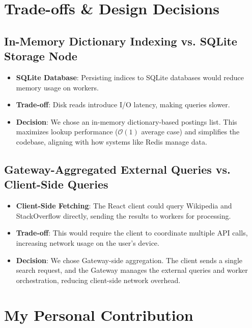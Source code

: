 \documentclass[11pt,a4paper]{article}
\begin{document}
\begin{itemize}
\newpage

\section{Trade-offs \& Design Decisions}

\subsection{In-Memory Dictionary Indexing vs. SQLite Storage Node}
\begin{itemize}
    \item \textbf{SQLite Database}: Persisting indices to SQLite databases would reduce memory usage on workers.
    \item \textbf{Trade-off}: Disk reads introduce I/O latency, making queries slower.
    \item \textbf{Decision}: We chose an in-memory dictionary-based postings list. This maximizes lookup performance ($\mathcal{O}(1)$ average case) and simplifies the codebase, aligning with how systems like Redis manage data.
\end{itemize}

\subsection{Gateway-Aggregated External Queries vs. Client-Side Queries}
\begin{itemize}
    \item \textbf{Client-Side Fetching}: The React client could query Wikipedia and StackOverflow directly, sending the results to workers for processing.
    \item \textbf{Trade-off}: This would require the client to coordinate multiple API calls, increasing network usage on the user's device.
    \item \textbf{Decision}: We chose Gateway-side aggregation. The client sends a single search request, and the Gateway manages the external queries and worker orchestration, reducing client-side network overhead.
\end{itemize}

\section{My Personal Contribution}


\end{itemize}
\end{document}
